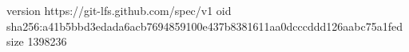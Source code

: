 version https://git-lfs.github.com/spec/v1
oid sha256:a41b5bbd3edada6acb7694859100e437b8381611aa0dcccddd126aabc75a1fed
size 1398236
